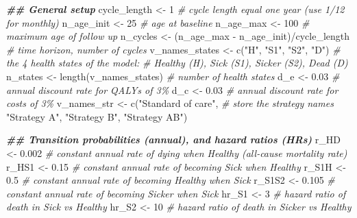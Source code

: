\documentclass[
]{article}
\newenvironment{Shaded}{\begin{snugshade}}{\end{snugshade}}
\newcommand{\CommentTok}[1]{\textcolor[rgb]{0.56,0.35,0.01}{\textit{#1}}}
\newcommand{\DecValTok}[1]{\textcolor[rgb]{0.00,0.00,0.81}{#1}}
\newcommand{\DocumentationTok}[1]{\textcolor[rgb]{0.56,0.35,0.01}{\textbf{\textit{#1}}}}
\newcommand{\FloatTok}[1]{\textcolor[rgb]{0.00,0.00,0.81}{#1}}
\newcommand{\FunctionTok}[1]{\textcolor[rgb]{0.00,0.00,0.00}{#1}}
\newcommand{\NormalTok}[1]{#1}
\newcommand{\OtherTok}[1]{\textcolor[rgb]{0.56,0.35,0.01}{#1}}
\newcommand{\SpecialCharTok}[1]{\textcolor[rgb]{0.00,0.00,0.00}{#1}}
\newcommand{\StringTok}[1]{\textcolor[rgb]{0.31,0.60,0.02}{#1}}
\begin{document}
\begin{Shaded}
\begin{Highlighting}[]
\DocumentationTok{\#\# General setup}
\NormalTok{cycle\_length }\OtherTok{\textless{}{-}} \DecValTok{1} \CommentTok{\# cycle length equal one year (use 1/12 for monthly)}
\NormalTok{n\_age\_init }\OtherTok{\textless{}{-}} \DecValTok{25}  \CommentTok{\# age at baseline}
\NormalTok{n\_age\_max  }\OtherTok{\textless{}{-}} \DecValTok{100} \CommentTok{\# maximum age of follow up}
\NormalTok{n\_cycles }\OtherTok{\textless{}{-}}\NormalTok{ (n\_age\_max }\SpecialCharTok{{-}}\NormalTok{ n\_age\_init)}\SpecialCharTok{/}\NormalTok{cycle\_length }\CommentTok{\# time horizon, number of cycles}
\NormalTok{v\_names\_states }\OtherTok{\textless{}{-}} \FunctionTok{c}\NormalTok{(}\StringTok{"H"}\NormalTok{, }\StringTok{"S1"}\NormalTok{, }\StringTok{"S2"}\NormalTok{, }\StringTok{"D"}\NormalTok{) }\CommentTok{\# the 4 health states of the model:}
                               \CommentTok{\# Healthy (H), Sick (S1), Sicker (S2), Dead (D)}
\NormalTok{n\_states }\OtherTok{\textless{}{-}} \FunctionTok{length}\NormalTok{(v\_names\_states) }\CommentTok{\# number of health states }
\NormalTok{d\_e }\OtherTok{\textless{}{-}} \FloatTok{0.03} \CommentTok{\# annual discount rate for QALYs of 3\%}
\NormalTok{d\_c }\OtherTok{\textless{}{-}} \FloatTok{0.03} \CommentTok{\# annual discount rate for costs of 3\%}
\NormalTok{v\_names\_str }\OtherTok{\textless{}{-}} \FunctionTok{c}\NormalTok{(}\StringTok{"Standard of care"}\NormalTok{, }\CommentTok{\# store the strategy names}
                 \StringTok{"Strategy A"}\NormalTok{, }
                 \StringTok{"Strategy B"}\NormalTok{,}
                 \StringTok{"Strategy AB"}\NormalTok{) }

\DocumentationTok{\#\# Transition probabilities (annual), and hazard ratios (HRs)}
\NormalTok{r\_HD   }\OtherTok{\textless{}{-}} \FloatTok{0.002} \CommentTok{\# constant annual rate of dying when Healthy (all{-}cause mortality rate)}
\NormalTok{r\_HS1  }\OtherTok{\textless{}{-}} \FloatTok{0.15}  \CommentTok{\# constant annual rate of becoming Sick when Healthy}
\NormalTok{r\_S1H  }\OtherTok{\textless{}{-}} \FloatTok{0.5}   \CommentTok{\# constant annual rate of becoming Healthy when Sick}
\NormalTok{r\_S1S2 }\OtherTok{\textless{}{-}} \FloatTok{0.105} \CommentTok{\# constant annual rate of becoming Sicker when Sick}
\NormalTok{hr\_S1  }\OtherTok{\textless{}{-}} \DecValTok{3}     \CommentTok{\# hazard ratio of death in Sick vs Healthy}
\NormalTok{hr\_S2  }\OtherTok{\textless{}{-}} \DecValTok{10}    \CommentTok{\# hazard ratio of death in Sicker vs Healthy }


\end{Highlighting}
\end{Shaded}
\end{document}
